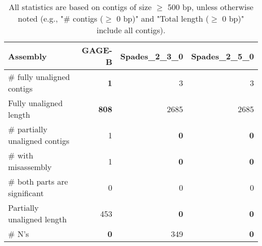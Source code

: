 \documentclass[12pt,a4paper]{article}
\begin{document}
\begin{table}[ht]
\begin{center}
\caption{All statistics are based on contigs of size $\geq$ 500 bp, unless otherwise noted (e.g., "\# contigs ($\geq$ 0 bp)" and "Total length ($\geq$ 0 bp)" include all contigs).}
\begin{tabular}{|l*{3}{|r}|}
\hline
Assembly & GAGE-B & Spades\_2\_3\_0 & Spades\_2\_5\_0 \\ \hline
\# fully unaligned contigs & {\bf 1} & 3 & 3 \\ \hline
Fully unaligned length & {\bf 808} & 2685 & 2685 \\ \hline
\# partially unaligned contigs & 1 & {\bf 0} & {\bf 0} \\ \hline
\hspace{5mm}\# with misassembly & 1 & {\bf 0} & {\bf 0} \\ \hline
\hspace{5mm}\# both parts are significant & 0 & 0 & 0 \\ \hline
Partially unaligned length & 453 & {\bf 0} & {\bf 0} \\ \hline
\# N's & {\bf 0} & 349 & {\bf 0} \\ \hline
\end{tabular}
\end{center}
\end{table}
\end{document}
